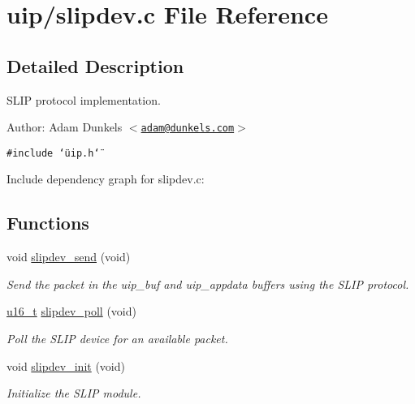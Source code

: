 \hypertarget{a00051}{
\section{uip/slipdev.c File Reference}
\label{a00051}
}


\subsection{Detailed Description}
SLIP protocol implementation. 

\begin{Desc}
\item[Author:]Adam Dunkels $<$\href{mailto:adam@dunkels.com}{\tt adam@dunkels.com}$>$ \end{Desc}


{\tt \#include \char`\"{}uip.h\char`\"{}}\par


Include dependency graph for slipdev.c:\subsection*{Functions}
\begin{CompactItemize}
\item 
void \hyperlink{a00068_gf8c1cf09a7c592ed1ea6b8595aa5f162}{slipdev\_\-send} (void)
\begin{CompactList}\small\item\em Send the packet in the uip\_\-buf and uip\_\-appdata buffers using the SLIP protocol. \item\end{CompactList}\item 
\hyperlink{a00070_gfc6499c1f28697aa3bfc2804d496fd11}{u16\_\-t} \hyperlink{a00068_g0fba24e31e1974adfdae516ddadb5ee2}{slipdev\_\-poll} (void)
\begin{CompactList}\small\item\em Poll the SLIP device for an available packet. \item\end{CompactList}\item 
void \hyperlink{a00068_g24cdb292a83c88750cdc170546038d0d}{slipdev\_\-init} (void)
\begin{CompactList}\small\item\em Initialize the SLIP module. \item\end{CompactList}\end{CompactItemize}
